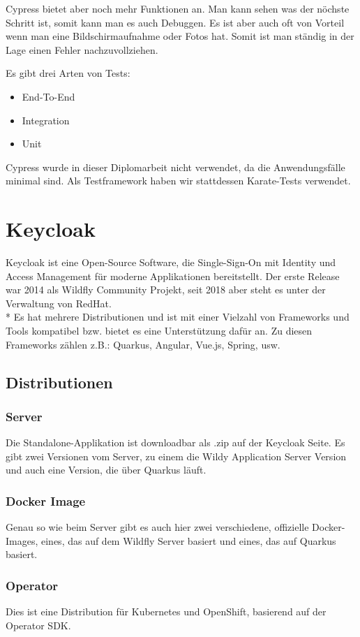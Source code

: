 Cypress bietet aber noch mehr Funktionen an. Man kann sehen was der nöchste Schritt ist, somit kann man es auch Debuggen.
Es ist aber auch oft von Vorteil wenn man eine Bildschirmaufnahme oder Fotos hat. Somit ist man ständig in der Lage einen 
Fehler nachzuvollziehen.

Es gibt drei Arten von Tests:

\begin{itemize}
    \item End-To-End
    \item Integration
    \item Unit
\end{itemize}
Cypress wurde in dieser Diplomarbeit nicht verwendet, da die Anwendungsfälle minimal sind.
 Als Testframework haben wir stattdessen Karate-Tests verwendet.

\pagebreak
\section{Keycloak}
\author{Benjamin Besic}
Keycloak ist eine Open-Source Software, die Single-Sign-On mit Identity und Access Management für moderne Applikationen bereitstellt. Der erste Release war 2014 als Wildfly Community Projekt, seit 2018 aber steht es unter der Verwaltung von RedHat. \cite{KeycloakWiki}  \\* 
Es hat mehrere Distributionen und ist mit einer Vielzahl von Frameworks und Tools kompatibel bzw. bietet es eine Unterstützung dafür an. Zu diesen Frameworks zählen z.B.: Quarkus, Angular, Vue.js, Spring, usw. \cite{KeyCloakDZone}

\subsection{Distributionen}
\subsubsection{Server}
Die Standalone-Applikation ist downloadbar als .zip auf der Keycloak Seite. Es gibt zwei Versionen vom Server, zu einem die Wildy Application Server Version und auch eine Version, die über Quarkus läuft.
\subsubsection{Docker Image}
Genau so wie beim Server gibt es auch hier zwei verschiedene, offizielle Docker-Images, eines, das auf dem Wildfly Server basiert und eines, das auf Quarkus basiert.
\subsubsection{Operator}
Dies ist eine Distribution für Kubernetes und OpenShift, basierend auf der Operator SDK. \cite{KeyCloakDZone}
